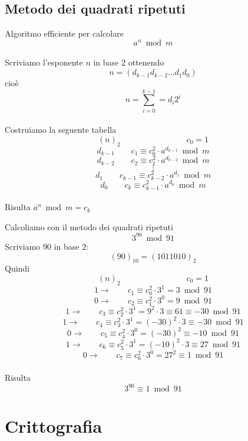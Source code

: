 \documentclass[a4paper,12pt, oneside]{book}
\begin{document}
\section{Metodo dei quadrati ripetuti}
Algoritmo efficiente per calcolare $$a^n \bmod m$$\\
Scriviamo l'esponente $n$ in base $2$
ottenendo $$n=(d_{k-1} d_{k-2} \dots d_1 d_0)$$
cioè $$n = \sum_{i=0}^{k-1} = d_i 2^i$$\\
Costruiamo la seguente tabella
$$(n)_2 \qquad \qquad \qquad \qquad c_0 = 1$$
$$d_{k-1} \qquad c_1 \equiv c_{0}^{2} \cdot a^{d_{k-1}} \bmod m$$
$$d_{k-2} \qquad c_2 \equiv c_{1}^{2} \cdot a^{d_{k-2}} \bmod m$$
$$\vdots$$
$$d_{1} \qquad c_{k-1} \equiv c_{k-2}^{2} \cdot a^{d_{1}} \bmod m$$
$$d_{0} \qquad c_k \equiv c_{k-1}^{2} \cdot a^{d_{0}} \bmod m$$\\
Risulta $a^n \bmod m = c_k$

\begin{shaded}
	\begin{esempio}
		Calcoliamo con il metodo dei quadrati ripetuti
		$$3^{90} \bmod 91$$
		Scriviamo $90$ in base $2$:
		$$(90)_{10} = (1011010)_2$$
		Quindi
		$$(n)_2 \qquad \qquad \qquad \qquad c_0 = 1$$
		$$1 \longrightarrow \qquad c_1 \equiv c_{0}^{2} \cdot 3^1 = 3 \bmod 91$$
		$$0 \longrightarrow \qquad c_2 \equiv c_{1}^{2} \cdot 3^0 = 9 \bmod 91$$
		$$1 \longrightarrow \qquad c_3 \equiv c_{2}^{2} \cdot 3^1 = 9^2 \cdot 3 \equiv 61 \equiv -30 \bmod 91$$
		$$1 \longrightarrow \qquad c_4 \equiv c_{3}^{2} \cdot 3^1 = (-30)^2 \cdot 3 \equiv -30 \bmod 91$$
		$$0 \longrightarrow \qquad c_5 \equiv c_{4}^{2} \cdot 3^0 = (-30)^2 \equiv -10 \bmod 91$$
		$$1 \longrightarrow \qquad c_6 \equiv c_{5}^{2} \cdot 3^1 = (-10)^2 \cdot 3 \equiv 27 \bmod 91$$
		$$0 \longrightarrow \qquad c_7 \equiv c_{6}^{2} \cdot 3^0 = 27^2 \equiv 1 \bmod 91$$\\
		Risulta $$3^{90} \equiv 1 \bmod 91$$
	\end{esempio}
\end{shaded}


\chapter{Crittografia}
\end{document}
